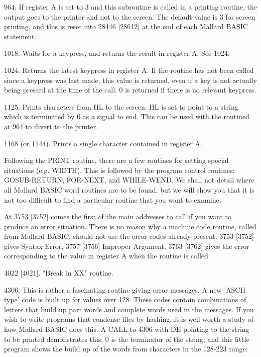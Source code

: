 964.  If  register A is set to 3 and this subroutine is called in  a  printing 
routine,  the  output goes to the printer and not to the screen.  The  default 
value  is 3 for screen printing, and this is reset into 28446 [28612]  at  the 
end of each Mallard BASIC statement.

1018. Waits for a keypress, and returns the result in register A. See 1024.

1024.  Returns the latest keypress in register A. If the routine has not  been 
called  since a keypress was last made, this value is returned, even if a  key 
is not actually being pressed at the time of the call. 0 is returned if  there 
is no relevant keypress.

1125. Prints characters from HL to the screen. HL is set to point to a  string 
which  is  terminated  by  0 as a signal to end. This can  be  used  with  the 
routined at 964 to divert to the printer.

1168 (or 1144). Prints a single character contained in register A.

Following  the  PRINT routine, there are a few routines  for  setting  special 
situations  (e.g.  WIDTH). This is followed by the program  control  routines: 
GOSUB-RETURN, FOR-NEXT, and WHILE-WEND. We shall not detail where all  Mallard 
BASIC  word routines are to be found, but we will show you that it is not  too 
difficult to find a particular routine that you want to examine.

At  3753 [3752] comes the first of the main addresses to call if you  want  to 
produce  an  error situation. There is no reason why a machine  code  routine, 
called  from  Mallard BASIC, should not use the error codes  already  present. 
3753  [3752]  gives Syntax Error, 3757 [3756] Improper Argument,  3763  [3762] 
gives  the error corresponding to the value in register A when the routine  is 
called.

4022 [4021]. "Break in XX" routine.

4306. This is rather a fascinating routine giving error messages. A new 'ASCII 
type'  code is built up for values over 128. These codes contain  combinations 
of  letters that build up part words and complete words used in the  messages. 
If you wish to write programs that condense files by hashing, it is well worth 
a study of how Mallard BASIC does this. A CALL to 4306 with DE pointing to the 
string to be printed demonstrates this. 0 is the terminator of the string, and 
this  little  program shows the build up of the words from characters  in  the 
128-223 range:

